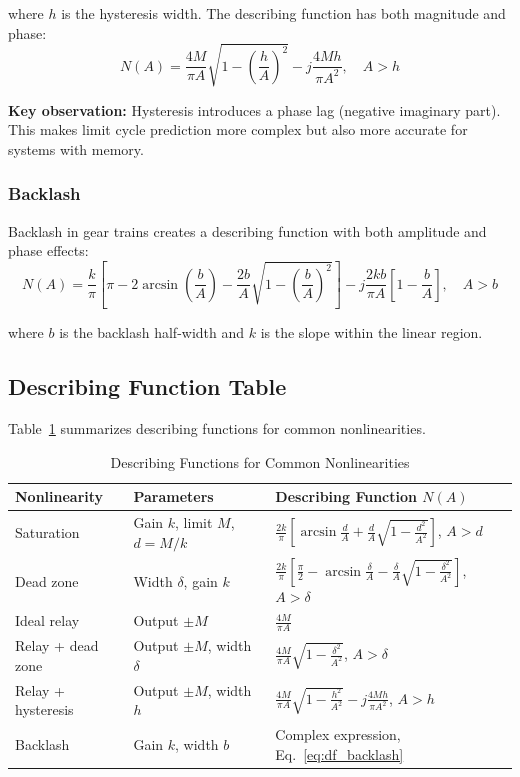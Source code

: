 where $h$ is the hysteresis width. The describing function has both magnitude and phase:
\begin{equation}
\boxed{N(A) = \frac{4M}{\pi A}\sqrt{1 - \left(\frac{h}{A}\right)^2} - j\frac{4Mh}{\pi A^2}, \quad A > h}
\label{eq:df_relay_hysteresis}
\end{equation}

\textbf{Key observation:} Hysteresis introduces a phase lag (negative imaginary part). This makes limit cycle prediction more complex but also more accurate for systems with memory.

\subsubsection{Backlash}

Backlash in gear trains creates a describing function with both amplitude and phase effects:
\begin{equation}
\boxed{N(A) = \frac{k}{\pi}\left[\pi - 2\arcsin\left(\frac{b}{A}\right) - \frac{2b}{A}\sqrt{1-\left(\frac{b}{A}\right)^2}\right] - j\frac{2kb}{\pi A}\left[1 - \frac{b}{A}\right], \quad A > b}
\label{eq:df_backlash}
\end{equation}

where $b$ is the backlash half-width and $k$ is the slope within the linear region.

\subsection{Describing Function Table}

Table~\ref{tab:describing_functions} summarizes describing functions for common nonlinearities.

\begin{table}[htbp]
\centering
\caption{Describing Functions for Common Nonlinearities}
\label{tab:describing_functions}
\begin{tabular}{@{}p{3cm}p{4cm}p{6cm}@{}}
\toprule
\textbf{Nonlinearity} & \textbf{Parameters} & \textbf{Describing Function $N(A)$} \\
\midrule
Saturation & Gain $k$, limit $M$, $d = M/k$ & $\frac{2k}{\pi}\left[\arcsin\frac{d}{A} + \frac{d}{A}\sqrt{1-\frac{d^2}{A^2}}\right]$, $A > d$ \\[8pt]
Dead zone & Width $\delta$, gain $k$ & $\frac{2k}{\pi}\left[\frac{\pi}{2} - \arcsin\frac{\delta}{A} - \frac{\delta}{A}\sqrt{1-\frac{\delta^2}{A^2}}\right]$, $A > \delta$ \\[8pt]
Ideal relay & Output $\pm M$ & $\frac{4M}{\pi A}$ \\[8pt]
Relay + dead zone & Output $\pm M$, width $\delta$ & $\frac{4M}{\pi A}\sqrt{1-\frac{\delta^2}{A^2}}$, $A > \delta$ \\[8pt]
Relay + hysteresis & Output $\pm M$, width $h$ & $\frac{4M}{\pi A}\sqrt{1-\frac{h^2}{A^2}} - j\frac{4Mh}{\pi A^2}$, $A > h$ \\[8pt]
Backlash & Gain $k$, width $b$ & Complex expression, Eq.~\eqref{eq:df_backlash} \\
\bottomrule
\end{tabular}
\end{table}

